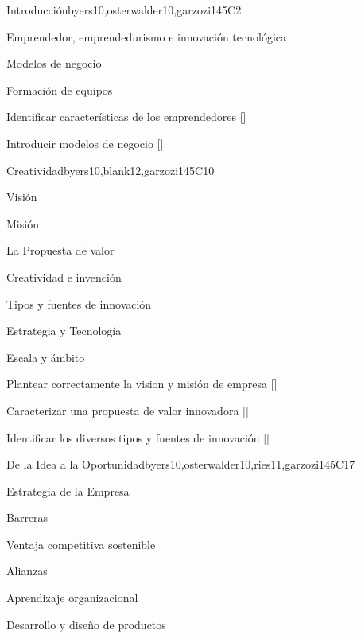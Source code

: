 \begin{syllabus}
\begin{unit}{}{Introducción}{byers10,osterwalder10,garzozi14}{5}{C2}
\begin{topics}
    \item Emprendedor, emprendedurismo e innovación tecnológica
    \item Modelos de negocio
    \item Formación de equipos
\end{topics}

\begin{learningoutcomes} 
    \item Identificar características de los emprendedores  [\Familiarity]
    \item Introducir modelos de negocio  [\Familiarity]
\end{learningoutcomes} 
\end{unit}
   
\begin{unit}{}{Creatividad}{byers10,blank12,garzozi14}{5}{C10}
    \begin{topics}
        \item Visión
        \item Misión
        \item La Propuesta de valor
        \item Creatividad e invención
        \item Tipos y fuentes de innovación
        \item Estrategia y Tecnología
        \item Escala y ámbito
    \end{topics}

    \begin{learningoutcomes} 
        \item Plantear correctamente la vision y misión de empresa  [\Usage]
        \item Caracterizar una propuesta de valor innovadora  [\Assessment]
        \item Identificar los diversos tipos y fuentes de innovación  [\Familiarity]
    \end{learningoutcomes} 
\end{unit}
   
\begin{unit}{}{De la Idea a la Oportunidad}{byers10,osterwalder10,ries11,garzozi14}{5}{C17}
\begin{topics}
    \item Estrategia de la Empresa
    \item Barreras 
    \item Ventaja competitiva sostenible
    \item Alianzas
    \item Aprendizaje organizacional
    \item Desarrollo y diseño de productos
\end{topics}


\end{unit}
\end{syllabus}
